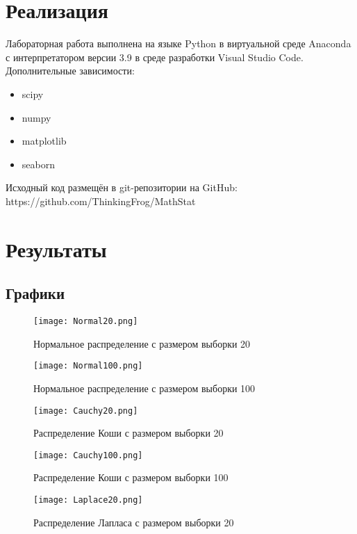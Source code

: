 \documentclass[12pt,a4paper]{article}
\begin{document}
\section{Реализация}
Лабораторная работа выполнена на языке Python в виртуальной среде Anaconda с интерпретатором версии 3.9 в среде разработки Visual Studio Code. Дополнительные зависимости:
\begin{itemize}
    \item scipy
    \item numpy
    \item matplotlib
    \item seaborn
\end{itemize}

Исходный код размещён в git-репозитории на GitHub: \\ https://github.com/ThinkingFrog/MathStat

\section {Результаты}
\subsection{Графики}
\begin{figure}[H]
    \centering
    \texttt{[image: Normal20.png]}
    \caption{Нормальное распределение с размером выборки 20}
    \label{fig:normal}
\end{figure}

\begin{figure}[H]
    \centering
    \texttt{[image: Normal100.png]}
    \caption{Нормальное распределение с размером выборки 100}
    \label{fig:normal}
\end{figure}

\begin{figure}[H]
    \centering
    \texttt{[image: Cauchy20.png]}
    \caption{Распределение Коши с размером выборки 20}
    \label{fig:normal}
\end{figure}

\begin{figure}[H]
    \centering
    \texttt{[image: Cauchy100.png]}
    \caption{Распределение Коши с размером выборки 100}
    \label{fig:normal}
\end{figure}

\begin{figure}[H]
    \centering
    \texttt{[image: Laplace20.png]}
    \caption{Распределение Лапласа с размером выборки 20}
    \label{fig:normal}
\end{figure}
\end{document}
